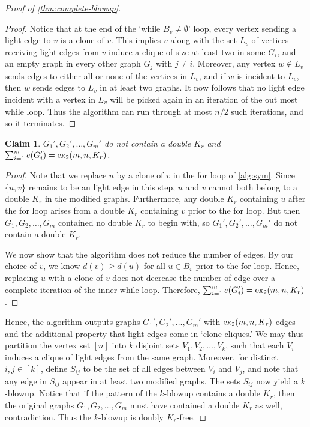 \documentclass[12pt]{report}
\newtheorem{claim}{Claim}[theorem]
\newcommand*{\dex}{\textnormal{ex}_2}
\begin{document}
\begin{proof}[Proof of \cref{thm:complete-blowup}]
  \begin{proof}
    Notice that at the end of the `while $B_v \neq \emptyset$' loop, every vertex sending a light edge to $v$ is a clone of $v$. This implies $v$ along with the set $L_v$ of vertices receiving light edges from $v$ induce a clique of size at least two in some $G_i$, and an empty graph in every other graph $G_j$ with $j \neq i$. Moreover, any vertex $w \notin L_v$ sends edges to either all or none of the vertices in $L_v$, and if $w$ is incident to $L_v$, then $w$ sends edges to $L_v$ in at least two graphs. It now follows that no light edge incident with a vertex in $L_v$ will be picked again in an iteration of the out most while loop. Thus the algorithm can run through at most $n/2$ such iterations, and so it terminates.
  \end{proof}

  \begin{claim}
    $G_1', G_2', \ldots, G_m'$ do not contain a double $K_r$ and $\sum_{i = 1}^m e(G_i') = \dex(m, n, K_r)$. 
  \end{claim}

  \begin{proof}
    Note that we replace $u$ by a clone of $v$ in the for loop of \cref{alg:sym}. Since $\{u, v\}$ remains to be an light edge in this step, $u$ and $v$ cannot both belong to a double $K_r$ in the modified graphs. Furthermore, any double $K_r$ containing $u$ after the for loop arises from a double $K_r$ containing $v$ prior to the for loop. But then $G_1, G_2, \ldots, G_m$ contained no double $K_r$ to begin with, so $G_1', G_2', \ldots, G_m'$ do not contain a double $K_r$.

    We now show that the algorithm does not reduce the number of edges. By our choice of $v$, we know $d(v) \geq d(u)$ for all $u \in B_v$ prior to the for loop. Hence, replacing $u$ with a clone of $v$ does not decrease the number of edge over a complete iteration of the inner while loop. Therefore, $\sum_{i = 1}^m e(G_i') = \dex(m, n, K_r)$. 
  \end{proof}

  Hence, the algorithm outputs graphs $G_1', G_2', \ldots, G_m'$ with $\dex(m, n, K_r)$ edges and the additional property that light edges come in `clone cliques.' We may thus partition the vertex set $[n]$ into $k$ disjoint sets $V_1, V_2, \ldots, V_k$, such that each $V_i$ induces a clique of light edges from the same graph. Moreover, for distinct $i, j \in [k]$, define $S_{ij}$ to be the set of all edges between $V_i$ and $V_j$, and note that any edge in $S_{ij}$ appear in at least two modified graphs. The sets $S_{ij}$ now yield a $k$-blowup. Notice that if the pattern of the $k$-blowup contains a double $K_r$, then the original graphs $G_1, G_2, \ldots, G_m$ must have contained a double $K_r$ as well, contradiction. Thus the $k$-blowup is doubly $K_r$-free. 


\end{proof}
\end{document}
